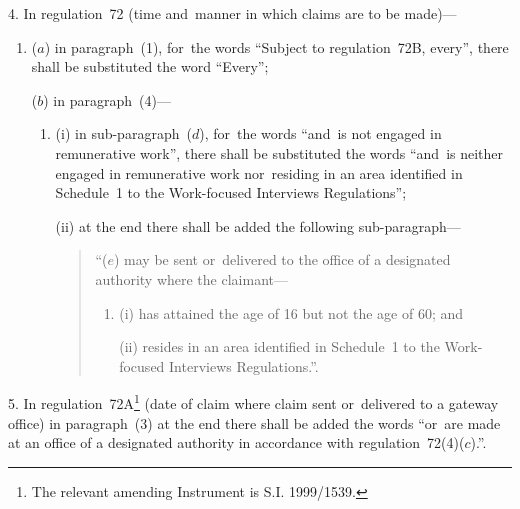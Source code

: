 \documentclass[12pt,a4paper]{article}
\begin{document}
4.  In regulation~72 (time and~manner in which claims are to be made)—
\begin{enumerate}\item[]
($a$) in paragraph~(1), for~the words “Subject to regulation~72B, every”, there shall be substituted the word “Every”;

($b$) in paragraph~(4)—
\begin{enumerate}\item[]
(i) in sub-paragraph~($d$), for~the words “and~is not engaged in remunerative work”, there shall be substituted the words “and~is neither engaged in remunerative work nor~residing in an area identified in Schedule~1 to the Work-focused Interviews Regulations”;

(ii) at the end there shall be added the following sub-paragraph—
\begin{quotation}
“($e$) may be sent or~delivered to the office of a designated authority where the claimant—
\begin{enumerate}\item[]
(i) has attained the age of 16 but not the age of 60; and

(ii) resides in an area identified in Schedule~1 to the Work-focused Interviews Regulations.”.
\end{enumerate}
\end{quotation}
\end{enumerate}
\end{enumerate}

\medskip

5.  In regulation~72A\footnote{\frenchspacing The relevant amending Instrument is S.I. 1999/1539.} (date of claim where claim sent or~delivered to a gateway office) in paragraph~(3) at the end there shall be added the words “or~are made at an office of a designated authority in accordance with regulation~72(4)($c$).”.

\medskip
\end{document}
